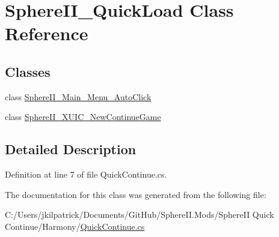 \hypertarget{class_sphere_i_i___quick_load}{}\section{Sphere\+I\+I\+\_\+\+Quick\+Load Class Reference}
\label{class_sphere_i_i___quick_load}
\subsection*{Classes}
\begin{DoxyCompactItemize}
\item 
class \mbox{\hyperlink{class_sphere_i_i___quick_load_1_1_sphere_i_i___main___menu___auto_click}{Sphere\+I\+I\+\_\+\+Main\+\_\+\+Menu\+\_\+\+Auto\+Click}}
\item 
class \mbox{\hyperlink{class_sphere_i_i___quick_load_1_1_sphere_i_i___x_u_i_c___new_continue_game}{Sphere\+I\+I\+\_\+\+X\+U\+I\+C\+\_\+\+New\+Continue\+Game}}
\end{DoxyCompactItemize}


\subsection{Detailed Description}


Definition at line 7 of file Quick\+Continue.\+cs.



The documentation for this class was generated from the following file\+:\begin{DoxyCompactItemize}
\item 
C\+:/\+Users/jkilpatrick/\+Documents/\+Git\+Hub/\+Sphere\+I\+I.\+Mods/\+Sphere\+I\+I Quick Continue/\+Harmony/\mbox{\hyperlink{_sphere_i_i_01_quick_01_continue_2_harmony_2_quick_continue_8cs}{Quick\+Continue.\+cs}}\end{DoxyCompactItemize}
